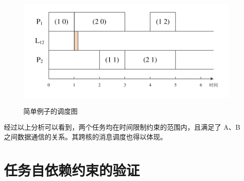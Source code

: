 \begin{figure}[!hbt]
  \centering
  \includegraphics[height=25ex]{figure/EXAMP-sch1.pdf}\\
  \caption{简单例子的调度图}\label{EXP-fig-sch1}
\end{figure}

经过以上分析可以看到，两个任务均在时间限制约束的范围内，且满足了 A、B 之间数据通信的关系。其跨核的消息调度也得以体现。


\section{任务自依赖约束的验证}

